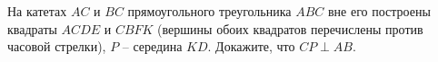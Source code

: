 \begin{ex}
	\begin{condition}
		На катетах \( AC  \) и \( BC  \) прямоугольного треугольника \( ABC  \) вне его построены квадраты \( ACDE  \) и \( CBFK  \) (вершины обоих квадратов перечислены против часовой стрелки), \( P \) – середина \( KD \). Докажите, что \( CP \perp AB \).
	\end{condition}
\end{ex}